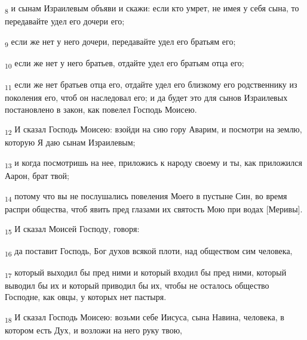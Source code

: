 \begin{tcolorbox}
\textsubscript{8} и сынам Израилевым объяви и скажи: если кто умрет, не имея у себя сына, то передавайте удел его дочери его;
\end{tcolorbox}
\begin{tcolorbox}
\textsubscript{9} если же нет у него дочери, передавайте удел его братьям его;
\end{tcolorbox}
\begin{tcolorbox}
\textsubscript{10} если же нет у него братьев, отдайте удел его братьям отца его;
\end{tcolorbox}
\begin{tcolorbox}
\textsubscript{11} если же нет братьев отца его, отдайте удел его близкому его родственнику из поколения его, чтоб он наследовал его; и да будет это для сынов Израилевых постановлено в закон, как повелел Господь Моисею.
\end{tcolorbox}
\begin{tcolorbox}
\textsubscript{12} И сказал Господь Моисею: взойди на сию гору Аварим, и посмотри на землю, которую Я даю сынам Израилевым;
\end{tcolorbox}
\begin{tcolorbox}
\textsubscript{13} и когда посмотришь на нее, приложись к народу своему и ты, как приложился Аарон, брат твой;
\end{tcolorbox}
\begin{tcolorbox}
\textsubscript{14} потому что вы не послушались повеления Моего в пустыне Син, во время распри общества, чтоб явить пред глазами их святость Мою при водах [Меривы].
\end{tcolorbox}
\begin{tcolorbox}
\textsubscript{15} И сказал Моисей Господу, говоря:
\end{tcolorbox}
\begin{tcolorbox}
\textsubscript{16} да поставит Господь, Бог духов всякой плоти, над обществом сим человека,
\end{tcolorbox}
\begin{tcolorbox}
\textsubscript{17} который выходил бы пред ними и который входил бы пред ними, который выводил бы их и который приводил бы их, чтобы не осталось общество Господне, как овцы, у которых нет пастыря.
\end{tcolorbox}
\begin{tcolorbox}
\textsubscript{18} И сказал Господь Моисею: возьми себе Иисуса, сына Навина, человека, в котором есть Дух, и возложи на него руку твою,
\end{tcolorbox}
